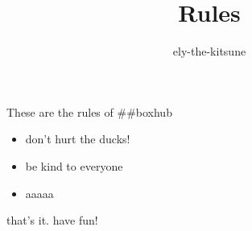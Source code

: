\title {Rules}
\author {ely-the-kitsune}


  These are the rules of ##boxhub
  \begin{itemize}
    \item don't hurt the ducks!
    \item be kind to everyone
    \item aaaaa
  \end{itemize}
  that's it. have fun!

